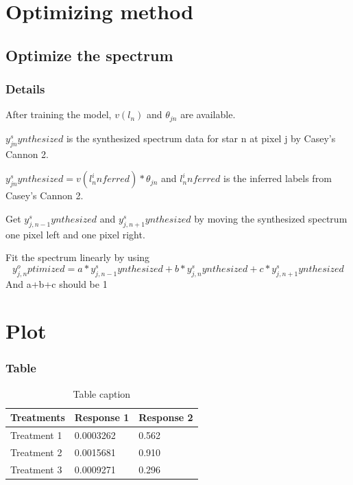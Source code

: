 \documentclass{beamer}
\begin{document}

\section{Optimizing method} %

\subsection{Optimize the spectrum} %

\begin{frame}
\frametitle{Details}

After training the model, \(v(l_n)\) and \(\theta_{jn}\) are available.

\(y_{jn}^synthesized\) is the synthesized spectrum data for star n at pixel j by Casey's 
Cannon 2.

\(y_{jn}^synthesized=v(l_n^inferred)*\theta_{jn}\) and \(l_n^inferred\) is the 
inferred labels from Casey's Cannon 2.
 
Get \(y_{j,n-1}^synthesized\) and \(y_{j,n+1}^synthesized\) by moving the synthesized spectrum one pixel left and one pixel right.

Fit the spectrum linearly by using 
\[y_{j,n}^optimized = a*y_{j,n-1}^synthesized + b*y_{j,n}^synthesized+c*y_{j,n+1}^synthesized\]
And a+b+c should be 1



\end{frame}

\section{Plot}

\begin{frame}
\frametitle{Table}
\begin{table}
\begin{tabular}{l l l}
\toprule
\textbf{Treatments} & \textbf{Response 1} & \textbf{Response 2}\\
\midrule
Treatment 1 & 0.0003262 & 0.562 \\
Treatment 2 & 0.0015681 & 0.910 \\
Treatment 3 & 0.0009271 & 0.296 \\
\bottomrule
\end{tabular}
\caption{Table caption}
\end{table}
\end{frame}
\end{document}

